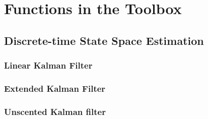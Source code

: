 %
\chapter{Functions in the Toolbox}
%

\label{ch:functions}




\section{Discrete-time State Space Estimation}

\subsection{Linear Kalman Filter}














\subsection{Extended Kalman Filter}














\subsection{Unscented Kalman filter}

